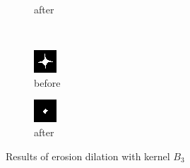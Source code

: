 \documentclass[12pt]{article}
\renewcommand{\subfiguresize}{.25\textwidth}
\begin{document}
\begin{figure}[H]
\begin{subfigure}[t]{\subfiguresize}
        \caption{after}
    \end{subfigure}\\[1em]
    \begin{subfigure}[t]{\subfiguresize}\centering
        \includegraphics[width=\textwidth]{img/image2.png}
        \caption{before}
    \end{subfigure}
    \hspace{2em}
    \begin{subfigure}[t]{\subfiguresize}\centering
        \includegraphics[width=\textwidth]{img/image2-erosion-8adj.png}
        \caption{after}
    \end{subfigure}
    \caption{Results of erosion dilation with kernel $B_3$}
\end{figure} 
\end{document}
